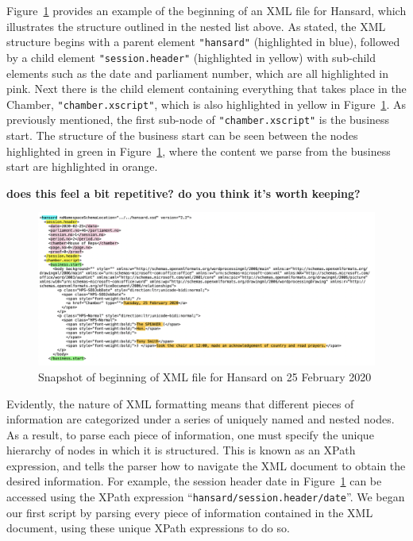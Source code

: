 \documentclass[
  letterpaper,
  DIV=11,
  numbers=noendperiod]{scrartcl}
\begin{document}
Figure~\ref{fig-xml1} provides an example of the beginning of an XML
file for Hansard, which illustrates the structure outlined in the nested
list above. As stated, the XML structure begins with a parent element
\texttt{"hansard"} (highlighted in blue), followed by a child element
\texttt{"session.header"} (highlighted in yellow) with sub-child
elements such as the date and parliament number, which are all
highlighted in pink. Next there is the child element containing
everything that takes place in the Chamber, \texttt{"chamber.xscript"},
which is also highlighted in yellow in Figure~\ref{fig-xml1}. As
previously mentioned, the first sub-node of \texttt{"chamber.xscript"}
is the business start. The structure of the business start can be seen
between the nodes highlighted in green in Figure~\ref{fig-xml1}, where
the content we parse from the business start are highlighted in orange.

\textbf{does this feel a bit repetitive? do you think it's worth
keeping?}

\begin{figure}

{\centering \includegraphics{xml1.png}

}

\caption{\label{fig-xml1}Snapshot of beginning of XML file for Hansard
on 25 February 2020}

\end{figure}

Evidently, the nature of XML formatting means that different pieces of
information are categorized under a series of uniquely named and nested
nodes. As a result, to parse each piece of information, one must specify
the unique hierarchy of nodes in which it is structured. This is known
as an XPath expression, and tells the parser how to navigate the XML
document to obtain the desired information. For example, the session
header date in Figure~\ref{fig-xml1} can be accessed using the XPath
expression ``\texttt{hansard/session.header/date}''. We began our first
script by parsing every piece of information contained in the XML
document, using these unique XPath expressions to do so.
\end{document}
